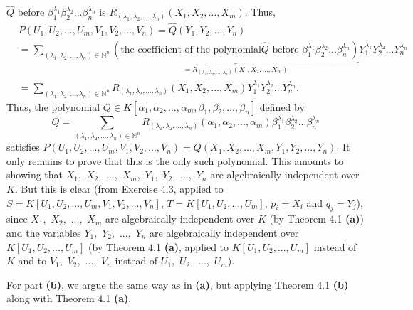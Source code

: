 \documentclass[numbers=enddot,12pt,final,onecolumn,notitlepage]{scrartcl}%
\begin{document}
$\widehat{Q}$ before $\beta_{1}^{\lambda_{1}}\beta_{2}^{\lambda_{2}}%
...\beta_{n}^{\lambda_{n}}$ is $R_{\left(  \lambda_{1},\lambda_{2}%
,...,\lambda_{n}\right)  }\left(  X_{1},X_{2},...,X_{m}\right)  $. Thus,%
\begin{align*}
&  P\left(  U_{1},U_{2},...,U_{m},V_{1},V_{2},...,V_{n}\right)  =\widehat{Q}%
\left(  Y_{1},Y_{2},...,Y_{n}\right) \\
&  =\sum_{\left(  \lambda_{1},\lambda_{2},...,\lambda_{n}\right)
\in\mathbb{N}^{n}}\underbrace{\left(  \text{the coefficient of the polynomial
}\widehat{Q}\text{ before }\beta_{1}^{\lambda_{1}}\beta_{2}^{\lambda_{2}%
}...\beta_{n}^{\lambda_{n}}\right)  }_{=R_{\left(  \lambda_{1},\lambda
_{2},...,\lambda_{n}\right)  }\left(  X_{1},X_{2},...,X_{m}\right)  }%
Y_{1}^{\lambda_{1}}Y_{2}^{\lambda_{2}}...Y_{n}^{\lambda_{n}}\\
&  =\sum_{\left(  \lambda_{1},\lambda_{2},...,\lambda_{n}\right)
\in\mathbb{N}^{n}}R_{\left(  \lambda_{1},\lambda_{2},...,\lambda_{n}\right)
}\left(  X_{1},X_{2},...,X_{m}\right)  Y_{1}^{\lambda_{1}}Y_{2}^{\lambda_{2}%
}...Y_{n}^{\lambda_{n}}.
\end{align*}
Thus, the polynomial $Q\in K\left[  \alpha_{1},\alpha_{2},...,\alpha_{m}%
,\beta_{1},\beta_{2},...,\beta_{n}\right]  $ defined by%
\[
Q=\sum_{\left(  \lambda_{1},\lambda_{2},...,\lambda_{n}\right)  \in
\mathbb{N}^{n}}R_{\left(  \lambda_{1},\lambda_{2},...,\lambda_{n}\right)
}\left(  \alpha_{1},\alpha_{2},...,\alpha_{m}\right)  \beta_{1}^{\lambda_{1}%
}\beta_{2}^{\lambda_{2}}...\beta_{n}^{\lambda_{n}}%
\]
satisfies $P\left(  U_{1},U_{2},...,U_{m},V_{1},V_{2},...,V_{n}\right)
=Q\left(  X_{1},X_{2},...,X_{m},Y_{1},Y_{2},...,Y_{n}\right)  $. It only
remains to prove that this is the only such polynomial. This amounts to
showing that $X_{1},$ $X_{2},$ $...,$ $X_{m},$ $Y_{1},$ $Y_{2},$ $...,$
$Y_{n}$ are algebraically independent over $K$. But this is clear (from
Exercise 4.3, applied to $S=K\left[  U_{1},U_{2},...,U_{m},V_{1}%
,V_{2},...,V_{n}\right]  $, $T=K\left[  U_{1},U_{2},...,U_{m}\right]  $,
$p_{i}=X_{i}$ and $q_{j}=Y_{j}$), since $X_{1},$ $X_{2},$ $...,$ $X_{m}$ are
algebraically independent over $K$ (by Theorem 4.1 \textbf{(a)}) and the
variables $Y_{1},$ $Y_{2},$ $...,$ $Y_{n}$ are algebraically independent over
$K\left[  U_{1},U_{2},...,U_{m}\right]  $ (by Theorem 4.1 \textbf{(a)},
applied to $K\left[  U_{1},U_{2},...,U_{m}\right]  $ instead of $K$ and to
$V_{1},$ $V_{2},$ $...,$ $V_{n}$ instead of $U_{1},$ $U_{2},$ $...,$ $U_{m}$).

For part \textbf{(b)}, we argue the same way as in \textbf{(a)}, but applying
Theorem 4.1 \textbf{(b)} along with Theorem 4.1 \textbf{(a)}.
\end{document}

